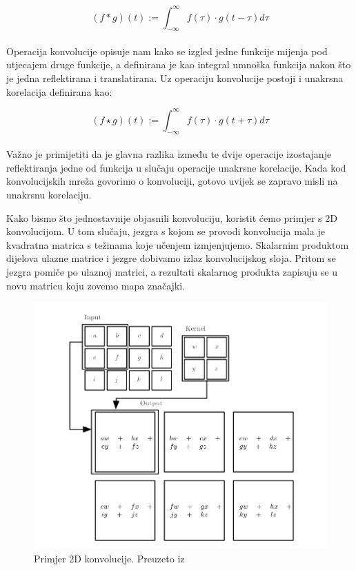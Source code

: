 \documentclass[times, utf8, zavrsni, numeric]{fer}
\begin{document}
\begin{equation}
    (f * g)(t) := \int_{-\infty}^{\infty}f(\tau) \cdot g(t-\tau)d\tau
    \label{eq:convolution}
\end{equation}
\\
Operacija konvolucije opisuje nam kako se izgled jedne funkcije mijenja pod utjecajem druge funkcije, 
a definirana je kao integral umnoška funkcija nakon što je jedna reflektirana i translatirana. 
Uz operaciju konvolucije postoji i unakrsna korelacija definirana kao:

\begin{equation}
    (f \star g)(t) := \int_{-\infty}^{\infty}f(\tau) \cdot g(t+\tau)d\tau
    \label{eq:correlation}
\end{equation}
\\
Važno je primijetiti da je glavna razlika između te dvije operacije izostajanje reflektiranja jedne od funkcija u slučaju operacije unakrsne korelacije. 
Kada kod konvolucijskih mreža govorimo o konvoluciji, gotovo uvijek se zapravo misli na unakrsnu korelaciju.

Kako bismo što jednostavnije objasnili konvoluciju, koristit ćemo primjer s 2D konvolucijom.
U tom slučaju, jezgra s kojom se provodi konvolucija mala je kvadratna matrica s težinama koje učenjem izmjenjujemo. Skalarnim produktom dijelova ulazne matrice i jezgre dobivamo izlaz konvolucijskog sloja.
Pritom se jezgra pomiče po ulaznoj matrici, a rezultati skalarnog produkta zapisuju se u novu matricu koju zovemo mapa značajki.

\pagebreak
\begin{figure}[htb]
    \centering
    \includegraphics[scale=0.5]{convolution.png}
    \caption{Primjer 2D konvolucije. Preuzeto iz~\cite{Goodfellow-et-al-2016}}
    \label{fig:convolution}
\end{figure}
\end{document}
